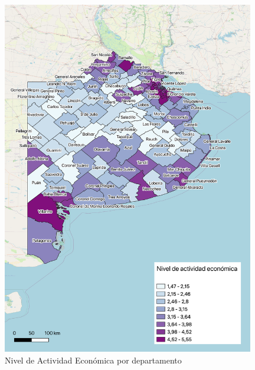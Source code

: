 \documentclass[11pt, spanish]{article}
\begin{document}
\begin{figure}[hbtp]
\caption{Nivel de Actividad Económica por departamento }
\centering
\includegraphics[width=11cm]{Act.jpg}
\end{figure}
\end{document}
